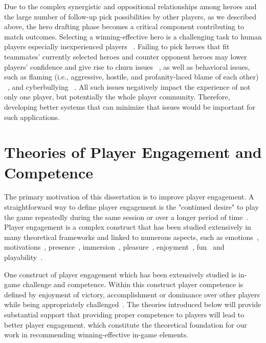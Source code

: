 Due to the complex synergistic and oppositional relationships among heroes and the large number of follow-up pick possibilities by other players, as we described above, the hero drafting phase becomes a critical component contributing to match outcomes. Selecting a winning-effective hero is a challenging task to human players especially inexperienced players ~\citep{johnson2015all}. Failing to pick heroes that fit teammates' currently selected heroes and counter opponent heroes may lower players' confidence and give rise to churn issues ~\citep{shores2014identification}, as well as behavioral issues, such as  flaming (i.e., aggressive, hostile, and profanity-laced blame of each other) ~\citep{kou2013regulating}, and cyberbullying ~\citep{kwak2015exploring}. All such issues negatively impact the experience of not only one player, but potentially the whole player community. Therefore, developing better systems that can minimize that issues would be important for such applications. 


\section{Theories of Player Engagement and Competence}\label{sec:related_theory_eng}

The primary motivation of this dissertation is to improve player engagement. A straightforward way to define player engagement is the "continued desire" to play the game repeatedly during the same session or over a longer period of time~\citep{schoenau2011player}. Player engagement is a complex construct that has been  studied extensively in many theoretical frameworks and linked to numerous aspects, such as emotions~\citep{sweetser2005gameflow,flow1990psychology,chen2007flow,cowley2008toward}, motivations~\citep{przybylski2010motivational,ryan2006motivational,yee2006demographics,yee2006motivations,sherry2006video}, presence~\citep{lombard1997heart,tamborini2006role}, immersion~\citep{mcmahan2003immersion,brown2004grounded,jennett2008measuring,ermi2005fundamental}, pleasure~\citep{costello2009tool}, enjoyment~\citep{ravaja2007fun,klimmt2003dimensions,mekler2014systematic}, fun~\citep{koster2013theory} and playability~\citep{federoff2003improving,federoff2002heuristics,desurvire2004using,nacke2009playability}.

One construct of player engagement which has been extensively studied is in-game challenge and competence. Within this construct player competence is defined by enjoyment of victory, accomplishment or dominance over other players while being appropriately challenged~\citep{ryan2006motivational,przybylski2010motivational,yee2006motivations,wu2010falling,sherry2006video,lazzaro2004we,schoenau2011player}. The theories introduced below will provide substantial support that providing proper competence to players will lead to better player engagement. which constitute the theoretical foundation for our work in recommending winning-effective in-game elements.

